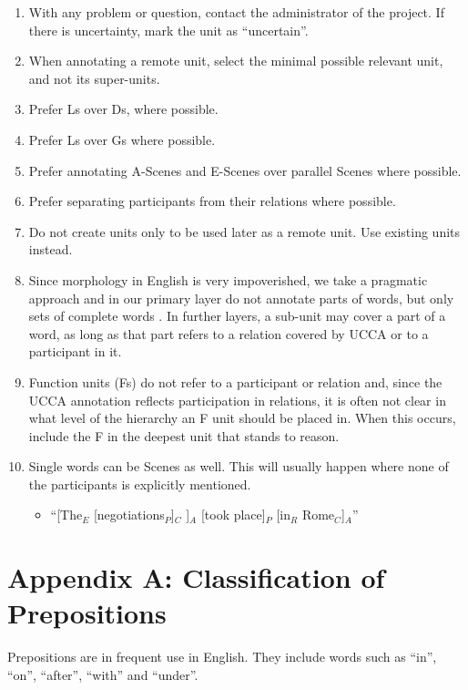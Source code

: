 \documentclass[11pt]{article}
\begin{document}
\begin{enumerate}
\item
With any problem or question, contact the administrator of the project. If there is uncertainty, mark the unit as ``uncertain''.
\item
When annotating a remote unit, select the minimal possible relevant unit, and not its super-units.
\item
Prefer Ls over Ds, where possible.
\item
Prefer Ls over Gs where possible.
\item
Prefer annotating A-Scenes and E-Scenes over parallel Scenes where possible.
\item
Prefer separating participants from their relations where possible.
\item
Do not create units only to be used later as a remote unit. Use existing units instead.
\item
Since morphology in English is very impoverished, we take a pragmatic approach and in our primary layer do not annotate parts of words, but only sets of complete words . In further layers, a sub-unit may cover a part of a word, as long as that part refers to a relation covered by UCCA or to a participant in it.
\item
Function units (Fs) do not refer to a participant or relation and, since the UCCA annotation reflects participation in relations, it is often not clear in what level of the hierarchy an F unit should be placed in. When this occurs, include the F in the deepest unit that stands to reason.
\item
Single words can be Scenes as well. This will usually happen where none of the participants is explicitly mentioned.
\begin{itemize}
\item
``[The$_E$ [negotiations$_P$]$_C$ ]$_A$ [took place]$_P$ [in$_R$ Rome$_C$]$_A$''
\end{itemize}


\end{enumerate}

\section{\large Appendix A: Classification of Prepositions}

Prepositions are in frequent use in English. They include words such as ``in'', ``on'', ``after'', ``with'' and ``under''.
\end{document}
